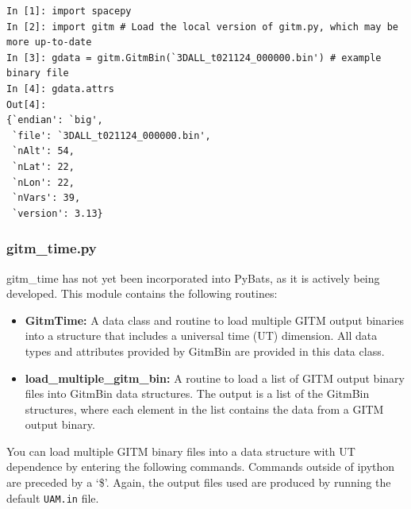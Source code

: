 \begin{verbatim}
In [1]: import spacepy
In [2]: import gitm # Load the local version of gitm.py, which may be more up-to-date
In [3]: gdata = gitm.GitmBin(`3DALL_t021124_000000.bin') # example binary file
In [4]: gdata.attrs
Out[4]:
{`endian': `big',
 `file': `3DALL_t021124_000000.bin',
 `nAlt': 54,
 `nLat': 22,
 `nLon': 22,
 `nVars': 39,
 `version': 3.13}
\end{verbatim}

\subsubsection{gitm\_time.py}

gitm\_time has not yet been incorporated into PyBats, as it is actively being developed.   This module contains the following routines:

\begin{itemize}
\item[]{\bf GitmTime: } A data class and routine to load multiple GITM output binaries into a structure that includes a universal time (UT) dimension.  All data types and attributes provided by GitmBin are provided in this data class.
\item[]{\bf load\_multiple\_gitm\_bin: } A routine to load a list of GITM output binary files into GitmBin data structures.  The output is a list of the GitmBin structures, where each element in the list contains the data from a GITM output binary.
\end{itemize}

You can load multiple GITM binary files into a data structure with UT dependence by entering the following commands.  Commands outside of ipython are preceded by a `\$'.  Again, the output files used are produced by running the default {\tt UAM.in} file.

